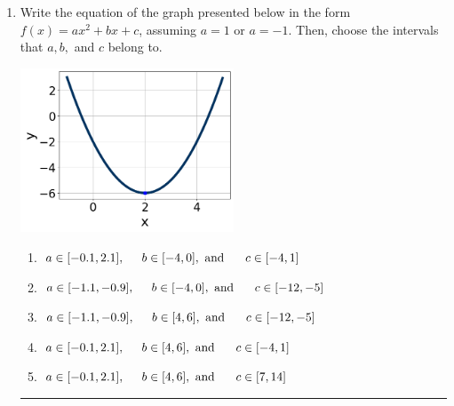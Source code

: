 \documentclass[14pt]{extbook}
\newcommand{\litem}[1]{\item#1\hspace*{-1cm}\rule{\textwidth}{0.4pt}}
\begin{document}
\begin{enumerate}
\litem{
Write the equation of the graph presented below in the form $f(x)=ax^2+bx+c$, assuming  $a=1$ or $a=-1$. Then, choose the intervals that $a, b,$ and $c$ belong to.
\begin{center}
    \includegraphics[width=0.5\textwidth]{../Figures/quadraticGraphToEquationB.png}
\end{center}
\begin{enumerate}[label=\Alph*.]
\item \( a \in [-0.1, 2.1], \hspace*{5mm} b \in [-4, 0], \text{ and } \hspace*{5mm} c \in [-4, 1] \)
\item \( a \in [-1.1, -0.9], \hspace*{5mm} b \in [-4, 0], \text{ and } \hspace*{5mm} c \in [-12, -5] \)
\item \( a \in [-1.1, -0.9], \hspace*{5mm} b \in [4, 6], \text{ and } \hspace*{5mm} c \in [-12, -5] \)
\item \( a \in [-0.1, 2.1], \hspace*{5mm} b \in [4, 6], \text{ and } \hspace*{5mm} c \in [-4, 1] \)
\item \( a \in [-0.1, 2.1], \hspace*{5mm} b \in [4, 6], \text{ and } \hspace*{5mm} c \in [7, 14] \)


\end{enumerate}}
\end{enumerate}
\end{document}
